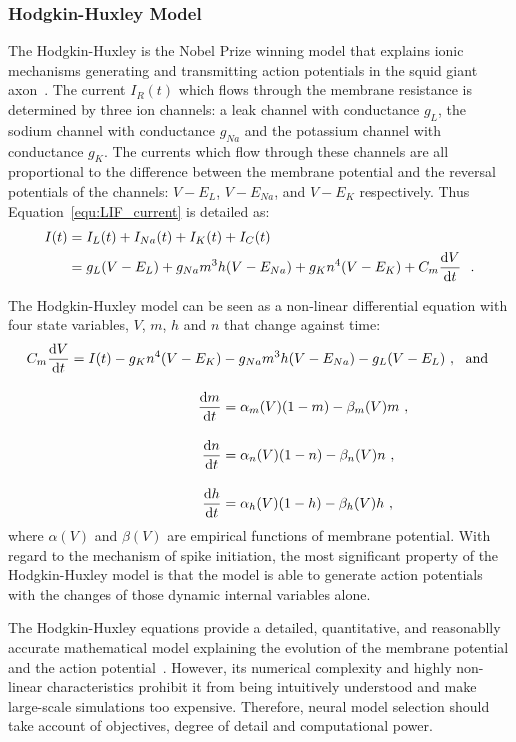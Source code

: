 \subsubsection{Hodgkin-Huxley Model}
The Hodgkin-Huxley is the Nobel Prize winning model that explains ionic mechanisms generating and transmitting action potentials in the squid giant axon~\citep{hodgkin1952quantitative}.
The current $I_R(t)$ which flows through the membrane resistance is determined by three ion channels: a leak channel with conductance $g_L$, the sodium channel with conductance $g_{Na}$ and the potassium channel with conductance $g_{K}$.
The currents which flow through these channels are all proportional to the difference between the membrane potential and the reversal potentials of the channels: $V-E_L$, $V-E_{Na}$, and $V-E_{K}$ respectively.
Thus Equation~\ref{equ:LIF_current} is detailed as:
\begin{equation}
\begin{aligned}
I(t) &= I_L(t) + I_{Na}(t) + I_{K}(t)+ I_C(t) \\
&= g_L(V-E_L) + g_{Na}m^3h(V-E_{Na}) + g_{K}n^4(V-E_{K})  + C_m \dfrac{\mathrm{d} V}{\mathrm{d} t}~~.
\end{aligned}
\label{equ:HH_current}
\end{equation}
 
The Hodgkin-Huxley model can be seen as a non-linear differential equation with four state variables, $V$, $m$, $h$ and $n$ that change against time:
\begin{equation}
\begin{aligned}
C_m \dfrac{\mathrm{d} V}{\mathrm{d} t} = I(t) - g_{K}n^4(V-E_{K}) &- g_{Na}m^3h(V-E_{Na}) - g_L(V-E_L)~, \textrm{~~and }\\[10pt]
\dfrac{\mathrm{d} m}{\mathrm{d} t} &= \alpha_m(V)(1-m) - \beta_m(V)m~, \\[10pt]
\dfrac{\mathrm{d} n}{\mathrm{d} t} &= \alpha_n(V)(1-n) - \beta_n(V)n~, \\[10pt]
\dfrac{\mathrm{d} h}{\mathrm{d} t} &= \alpha_h(V)(1-h) - \beta_h(V)h~,
\end{aligned}
\end{equation} 
where $\alpha(V)$ and  $\beta(V)$ are empirical functions of membrane potential.
With regard to the mechanism of spike initiation, the most significant property of the Hodgkin-Huxley model is that the model is able to generate action potentials with the changes of those dynamic internal variables alone.

The Hodgkin-Huxley equations provide a detailed, quantitative, and reasonablly accurate mathematical model explaining the evolution of the membrane potential and the action potential~\citep{byrne2014molecules}.
However, its numerical complexity and highly non-linear characteristics prohibit it from being intuitively understood and make large-scale simulations too expensive.
Therefore, neural model selection should take account of objectives, degree of detail and computational power.


